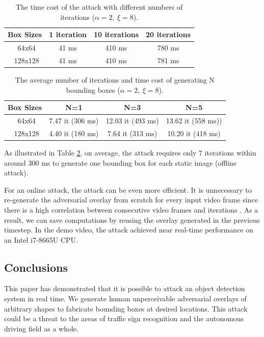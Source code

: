 \begin{table}[H]
    \centering
    \begin{tabular}{cccc}
    \hline
    Box Sizes & 1 iteration & 10 iterations & 20 iterations\\
    \hline
    \ 64x64    & 41 ms  & 410 ms & 780 ms \\
    \ 128x128  & 41 ms  & 410 ms & 781 ms \\
    \hline
    \end{tabular}
    \caption{The time cost of the attack with different numbers of iterations ($\alpha=2,\ \xi=8$).}
    \label{tab:fix-it}
\end{table}

\begin{table}[H]
    \centering
    \begin{tabular}{cccc}
    \hline
    Box Sizes & N=1 & N=3 & N=5\\
    \hline
    \ 64x64    & 7.47 it (306 ms)  & 12.03 it (493 ms) &  13.62 it (558 ms)) \\
    \ 128x128  & 4.40 it (180 ms)  & 7.64 it (313 ms) & 10.20 it (418 ms) \\
    \hline
    \end{tabular}
    \caption{The average number of iterations and time cost of generating N bounding boxes ($\alpha=2,\ \xi=8$).}
    \label{tab:fix-box}
\end{table}

As illustrated in Table \ref{tab:fix-box}, on average, the attack requires only 7 iterations within around 300 ms to generate one bounding box for each static image (offline attack). 

For an online attack, the attack can be even more efficient. It is unnecessary to re-generate the adversarial overlay from scratch for every input video frame since there is a high correlation between consecutive video frames and iterations \cite{ilyas2018prior}. As a result, we can save computations by reusing the overlay generated in the previous timestep. In the demo video, the attack achieved near real-time performance on an Intel i7-8665U CPU.

\subsection{Conclusions}

This paper has demonstrated that it is possible to attack an object detection system in real time. We generate human unperceivable adversarial overlays of arbitrary shapes to fabricate bounding boxes at desired locations. This attack could be a threat to the areas of traffic sign recognition and the autonomous driving field as a whole.

